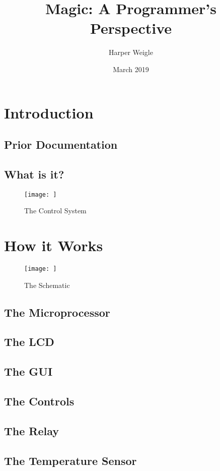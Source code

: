 \documentclass{article}
\title{Magic: A Programmer's Perspective}
\author{Harper Weigle }
\date{March 2019}
\begin{document}
\begin{titlepage}
    \centering
    \maketitle
    \vfill
\end{titlepage}
\tableofcontents
\listoffigures
\section{Introduction}
\subsection{Prior Documentation}
\subsection{What is it?}
\begin{figure}
    \centering
    \texttt{[image: ]}
    \caption{The Control System}
    \label{fig:my_label}
\end{figure}
\section{How it Works}
\begin{figure}
    \centering
    \texttt{[image: ]}
    \caption{The Schematic}
    \label{fig:my_label}
\end{figure}
\subsection{The Microprocessor}
\blindtext
\subsection{The LCD}
\blindtext
\subsection{The GUI}
\blindtext
\subsection{The Controls}
\blindtext
\subsection{The Relay}
\blindtext
\subsection{The Temperature Sensor}
\blindtext
\end{document}
